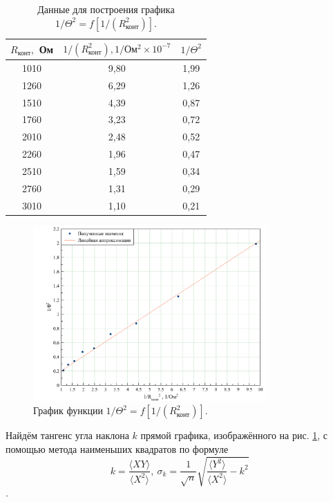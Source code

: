 \documentclass[a4paper, 12pt, twoside]{article}
\begin{document}
 \begin{table}[H]
 	\centering
 	\caption{Данные для построения графика $1/\Theta^{2} = f[1/(R^{2}_{\text{конт}})]$. }
 	\label{tabel6}
 	\begin{tabular}{|c|c|c|}
 		\hline
 		$R_{\text{конт}},$ Ом & $1/(R^{2}_{\text{конт}}), 1/\text{Ом$^2$}\times10^{-7}$  & $1/\Theta^2$\\ \hline
 		1010  & 9,80                                          & 1,99                      \\ \hline
 		1260  & 6,29                                          & 1,26                      \\ \hline
 		1510  & 4,39                                          & 0,87                      \\ \hline
 		1760  & 3,23                                          & 0,72                      \\ \hline
 		2010  & 2,48                                          & 0,52                      \\ \hline
 		2260  & 1,96                                          & 0,47                      \\ \hline
 		2510  & 1,59                                          & 0,34                      \\ \hline
 		2760  & 1,31                                          & 0,29                      \\ \hline
 		3010  & 1,10                                          & 0,21                      \\ \hline
 	\end{tabular}
 \end{table}

\begin{figure}[H]
	\centering
	\includegraphics[width = 0.8\textwidth]{graph2}
	\caption{График функции $1/\Theta^{2} = f[1/(R^{2}_{\text{конт}})]$.}
	\label{graph2}
\end{figure}
Найдём тангенс угла наклона $k$ прямой графика, изображённого на рис. \ref{graph2}, с помощью метода наименьших квадратов по формуле $$ k = \dfrac{\langle XY\rangle}{\langle X^2\rangle},~ \sigma_{k} = \dfrac{1}{\sqrt{n}}\sqrt{\dfrac{\langle Y^2 \rangle}{\langle X^2 \rangle} - k^2}$$.
\end{document}
